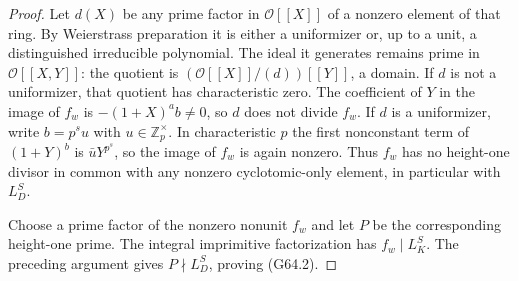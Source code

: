 \begin{proof}
Let $d(X)$ be any prime factor in $\mathcal O[[X]]$ of a nonzero
element of that ring.  By Weierstrass preparation it is either a
uniformizer or, up to a unit, a distinguished irreducible polynomial.
The ideal it generates remains prime in $\mathcal O[[X,Y]]$:
the quotient is $(\mathcal O[[X]]/(d))[[Y]]$, a domain.
If $d$ is not a uniformizer, that quotient has characteristic zero.
The coefficient of $Y$ in the image of $f_w$ is
$-(1+X)^a b\ne0$, so $d$ does not divide $f_w$.
If $d$ is a uniformizer, write $b=p^s u$ with
$u\in\mathbb Z_p^\times$.  In characteristic $p$ the first
nonconstant term of $(1+Y)^b$ is
$\bar uY^{p^s}$, so the image of $f_w$ is again nonzero.
Thus $f_w$ has no height-one divisor in common with any nonzero
cyclotomic-only element, in particular with $L_D^S$.

Choose a prime factor of the nonzero nonunit $f_w$ and let $P$
be the corresponding height-one prime.  The integral imprimitive
factorization has $f_w\mid L_K^S$.  The preceding argument gives
$P\nmid L_D^S$, proving (G64.2).
\end{proof}

